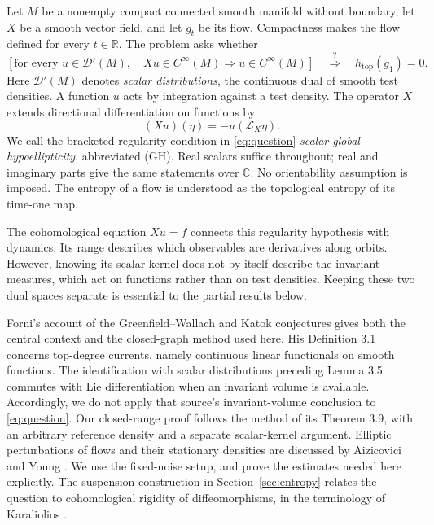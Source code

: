 \documentclass[11pt]{article}
\theoremstyle{definition}
\theoremstyle{remark}
\newcommand{\R}{\mathbb R}
\newcommand{\D}{\mathcal D'}
\newcommand{\htop}{h_{\mathrm{top}}}
\begin{document}
Let $M$ be a nonempty compact connected smooth manifold without boundary, let $X$ be a smooth vector field, and let $g_t$ be its flow. Compactness makes the flow defined for every $t\in\R$. The problem asks whether
\begin{equation}\label{eq:question}
 \left[\text{for every }u\in\D(M),\quad
 Xu\in C^\infty(M)\Longrightarrow u\in C^\infty(M)\right]
 \quad\stackrel{?}{\Longrightarrow}\quad \htop(g_1)=0.
\end{equation}
Here $\D(M)$ denotes \emph{scalar distributions}, the continuous dual of smooth test densities. A function $u$ acts by integration against a test density. The operator $X$ extends directional differentiation on functions by
\[
 (Xu)(\eta)=-u(\mathcal L_X\eta).
\]
We call the bracketed regularity condition in \eqref{eq:question} \emph{scalar global hypoellipticity}, abbreviated (GH). Real scalars suffice throughout; real and imaginary parts give the same statements over $\mathbb C$. No orientability assumption is imposed. The entropy of a flow is understood as the topological entropy of its time-one map.

The cohomological equation $Xu=f$ connects this regularity hypothesis with dynamics. Its range describes which observables are derivatives along orbits. However, knowing its scalar kernel does not by itself describe the invariant measures, which act on functions rather than on test densities. Keeping these two dual spaces separate is essential to the partial results below.

Forni's account of the Greenfield--Wallach and Katok conjectures \cite{Forni} gives both the central context and the closed-graph method used here. His Definition 3.1 concerns top-degree currents, namely continuous linear functionals on smooth functions. The identification with scalar distributions preceding Lemma 3.5 commutes with Lie differentiation when an invariant volume is available. Accordingly, we do not apply that source's invariant-volume conclusion to \eqref{eq:question}. Our closed-range proof follows the method of its Theorem 3.9, with an arbitrary reference density and a separate scalar-kernel argument. Elliptic perturbations of flows and their stationary densities are discussed by Aizicovici and Young \cite{AY}. We use the fixed-noise setup, and prove the estimates needed here explicitly. The suspension construction in Section~\ref{sec:entropy} relates the question to cohomological rigidity of diffeomorphisms, in the terminology of Karaliolios \cite[\S1.1]{Kar}.
\end{document}
